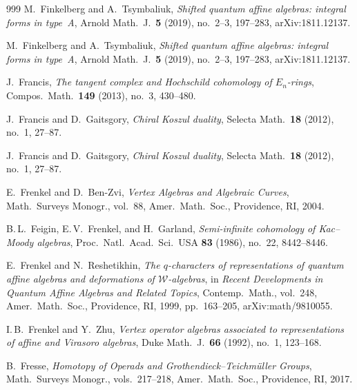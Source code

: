 \documentclass[11pt]{memoir}
\begin{document}
\begin{thebibliography}{999}
M.~Finkelberg and A.~Tsymbaliuk, \emph{Shifted quantum affine algebras: integral forms in type~A}, Arnold Math.\ J.\ \textbf{5} (2019), no.~2--3, 197--283, arXiv:1811.12137.

M.~Finkelberg and A.~Tsymbaliuk, \emph{Shifted quantum affine algebras: integral forms in type~A}, Arnold Math.\ J.\ \textbf{5} (2019), no.~2--3, 197--283, arXiv:1811.12137.

J.~Francis, \emph{The tangent complex and Hochschild cohomology of $E_n$-rings}, Compos.\ Math.\ \textbf{149} (2013), no.~3, 430--480.

J.~Francis and D.~Gaitsgory, \emph{Chiral Koszul duality}, Selecta Math.\ \textbf{18} (2012), no.~1, 27--87.

J.~Francis and D.~Gaitsgory, \emph{Chiral Koszul duality}, Selecta Math.\ \textbf{18} (2012), no.~1, 27--87.

E.~Frenkel and D.~Ben-Zvi, \emph{Vertex Algebras and Algebraic Curves}, Math.\ Surveys Monogr., vol.~88, Amer.\ Math.\ Soc., Providence, RI, 2004.

B.\,L.~Feigin, E.\,V.~Frenkel, and H.~Garland, \emph{Semi-infinite cohomology of Kac--Moody algebras}, Proc.\ Natl.\ Acad.\ Sci.\ USA \textbf{83} (1986), no.~22, 8442--8446.

E.~Frenkel and N.~Reshetikhin, \emph{The $q$-characters of representations of quantum affine algebras and deformations of $\mathcal W$-algebras}, in \emph{Recent Developments in Quantum Affine Algebras and Related Topics}, Contemp.\ Math., vol.~248, Amer.\ Math.\ Soc., Providence, RI, 1999, pp.~163--205, arXiv:math/9810055.

I.\,B.~Frenkel and Y.~Zhu, \emph{Vertex operator algebras associated to representations of affine and Virasoro algebras}, Duke Math.\ J.\ \textbf{66} (1992), no.~1, 123--168.

B.~Fresse, \emph{Homotopy of Operads and Grothendieck--Teichm\"uller Groups}, Math.\ Surveys Monogr., vols.~217--218, Amer.\ Math.\ Soc., Providence, RI, 2017.


\end{thebibliography}
\end{document}
